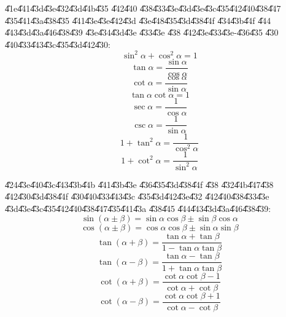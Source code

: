 \documentclass{article}
\begin{document}
\U{41e}\U{441}\U{43d}\U{43e}\U{432}\U{43d}\U{44b}\U{435} \U{442}\U{440}%
\U{438}\U{433}\U{43e}\U{43d}\U{43e}\U{43c}\U{435}\U{442}\U{440}\U{438}\U{447}%
\U{435}\U{441}\U{43a}\U{438}\U{435} \U{441}\U{43e}\U{43e}\U{442}\U{43d}%
\U{43e}\U{448}\U{435}\U{43d}\U{438}\U{44f} \U{434}\U{43b}\U{44f} \U{444}%
\U{443}\U{43d}\U{43a}\U{446}\U{438}\U{439} \U{43e}\U{434}\U{43d}\U{43e}%
\U{433}\U{43e} \U{438} \U{442}\U{43e}\U{433}\U{43e}-\U{436}\U{435} \U{430}%
\U{440}\U{433}\U{443}\U{43c}\U{435}\U{43d}\U{442}\U{430}:%
\[
\sin ^{2}\alpha +\cos ^{2}\alpha =1 
\]%
\[
\tan \alpha =\frac{\sin \alpha }{\cos \alpha } 
\]%
\[
\cot \alpha =\frac{\cos \alpha }{\sin \alpha } 
\]%
\[
\tan \alpha \cot \alpha =1 
\]%
\[
\sec \alpha =\frac{1}{\cos \alpha } 
\]%
\[
\csc \alpha =\frac{1}{\sin \alpha } 
\]%
\[
1+\tan ^{2}\alpha =\frac{1}{\cos ^{2}\alpha } 
\]%
\[
1+\cot ^{2}\alpha =\frac{1}{\sin ^{2}\alpha } 
\]

\U{424}\U{43e}\U{440}\U{43c}\U{443}\U{43b}\U{44b} \U{441}\U{43b}\U{43e}%
\U{436}\U{435}\U{43d}\U{438}\U{44f} \U{438} \U{432}\U{44b}\U{447}\U{438}%
\U{442}\U{430}\U{43d}\U{438}\U{44f} \U{430}\U{440}\U{433}\U{443}\U{43c}%
\U{435}\U{43d}\U{442}\U{43e}\U{432} \U{442}\U{440}\U{438}\U{433}\U{43e}%
\U{43d}\U{43e}\U{43c}\U{435}\U{442}\U{440}\U{438}\U{447}\U{435}\U{441}\U{43a}%
\U{438}\U{445} \U{444}\U{443}\U{43d}\U{43a}\U{446}\U{438}\U{439}:%
\[
\sin \left( \alpha \pm \beta \right) =\sin \alpha \cos \beta \pm \sin \beta
\cos \alpha 
\]%
\[
\cos \left( \alpha \pm \beta \right) =\cos \alpha \cos \beta \pm \sin \alpha
\sin \beta 
\]%
\[
\tan \left( \alpha +\beta \right) =\frac{\tan \alpha +\tan \beta }{1-\tan
\alpha \tan \beta } 
\]%
\[
\tan \left( \alpha -\beta \right) =\frac{\tan \alpha -\tan \beta }{1+\tan
\alpha \tan \beta } 
\]%
\[
\cot \left( \alpha +\beta \right) =\frac{\cot \alpha \cot \beta -1}{\cot
\alpha +\cot \beta } 
\]%
\[
\cot \left( \alpha -\beta \right) =\frac{\cot \alpha \cot \beta +1}{\cot
\alpha -\cot \beta } 
\]
\end{document}
